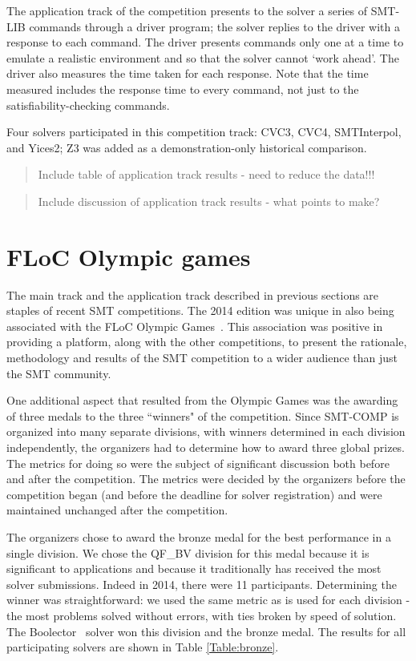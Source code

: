 \documentclass[twosize,11pt]{article}
\newcommand{\comment}[2]{\begin{quote}\sc #1\marginpar{\textcolor{red}{$\ast^{\mbox{#2}}$}}\end{quote}}
\newcommand{\davidc}[1]{\comment{#1}{DC}}
\begin{document}
The application track of the competition presents to the solver a series of SMT-LIB commands through a driver program; the solver replies to the driver with a 
response to each command. The driver presents commands only one at a time to emulate a realistic environment and so that the solver cannot `work ahead'. The driver also measures the time taken for each response. Note that the time measured includes the response time to every command, not just to the satisfiability-checking commands.

Four solvers participated in this competition track: CVC3, CVC4, SMTInterpol, and Yices2; Z3 was added as a demonstration-only historical comparison.

\davidc{Include table of application track results - need to reduce the data!!!}

\davidc{Include discussion of application track results - what points to make?}


\section{FLoC Olympic games}
\label{sec:floc}

The main track and the application track described in previous sections are staples of recent SMT competitions. The 2014 edition was unique in also being associated with the FLoC Olympic Games~\cite{TBD}.
This association was positive in providing a platform, along with the other competitions, to present the
rationale, methodology and results of the SMT competition to a wider audience than just the SMT community.

One additional aspect that resulted from the Olympic Games was the awarding of three medals to the three ``winners" of the competition. Since SMT-COMP is organized into many separate divisions, with winners determined in each division independently, the organizers had to determine how to award three global prizes.
The metrics for doing so were the subject of significant discussion both before and after the competition.
The metrics were decided by the organizers before the competition began (and before the deadline for solver registration) and were maintained unchanged after the competition.

The organizers chose to award the bronze medal for the best performance in a single division. We chose  the QF\_BV division for this medal because it is significant to applications and because it traditionally has received the most solver submissions. Indeed in 2014, there were 11 participants. Determining the winner was straightforward: we used the same metric as is used for each division - the most problems solved without errors, with ties broken by speed of solution. The Boolector~\cite{TBD} solver won this division and the bronze medal. The results for all participating solvers are shown in Table \ref{Table:bronze}.
\end{document}
